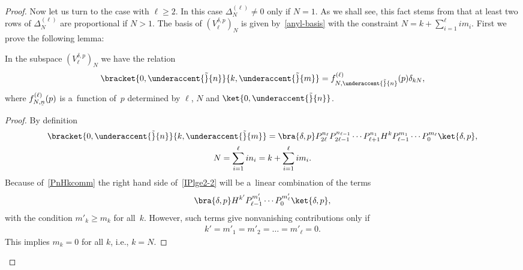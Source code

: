 \begin{proof}
Now let us turn to the case with $\ell \geq 2$.
In this case $ \Delta^{(\ell)}_N \neq 0 $ only if $N = 1$.
As we shall see, this fact stems from that at least two rows of $ \Delta^{(\ell)}_N $ are proportional if $ N > 1$.
The basis of $(V^{\delta,p}_{\ell})_N $ is given by~\eqref{anyl-basis} with the constraint $  N = k+
\sum\limits_{i=1}^{\ell} i   m_i$.
First we prove the following lemma:
\begin{lemma}
\label{lemma2}
In the subspace $ (V^{\delta,p}_{\ell})_N $ we have the relation
\begin{gather*}
\bracket{0,\underaccent{\tilde}{n}}{k,\underaccent{\tilde}{m}} = f^{(\ell)}_{N,\underaccent{\tilde}{n}}(p) \delta_{kN},
\end{gather*}
where $ f^{(\ell)}_{N,\underaccent{\tilde}{n}}(p) $ is a~function of~$p$ determined by $ \ell$, $N $ and $
\ket{0,\underaccent{\tilde}{n}}$.
\end{lemma}
\begin{proof}
By def\/inition
\begin{gather}
    \bracket{0,\underaccent{\tilde}{n}}{k,\underaccent{\tilde}{m}} = \bra{\delta,p} P_{2\ell}^{n_{\ell}}
P_{2\ell-1}^{n_{\ell-1}} \cdots P_{\ell+1}^{n_1} H^k P_{\ell-1}^{m_1} \cdots P_0^{m_{\ell}} \ket{\delta,p},
\label{IPlge2-2}
\\
    N = \sum\limits_{i=1}^{\ell} i n_i = k + \sum\limits_{i=1}^{\ell} i  m_i.
\nonumber
\end{gather}
Because of~\eqref{PnHkcomm} the right hand side of~\eqref{IPlge2-2} will be a~linear combination of the terms
\begin{gather*}
\bra{\delta,p} H^{k'} P_{\ell-1}^{m'_1} \cdots P_0^{m'_{\ell}} \ket{\delta,p},
\end{gather*}
with the condition $ m'_k \geq m_k $ for all~$k$.
However, such terms give nonvanishing contributions only if
\begin{gather*}
k' = m'_1 = m'_2 = \dots = m'_{\ell} = 0.
\end{gather*}
This implies $ m_k = 0 $ for all $k$, i.e., $ k = N$.
\end{proof}


\end{proof}
